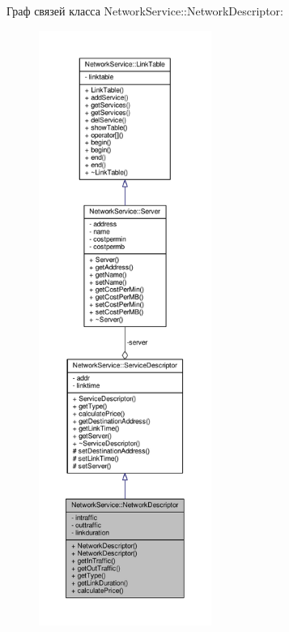 Граф связей класса Network\+Service\+:\+:Network\+Descriptor\+:\nopagebreak
\begin{figure}[H]
\begin{center}
\leavevmode
\includegraphics[height=550pt]{class_network_service_1_1_network_descriptor__coll__graph}
\end{center}
\end{figure}
